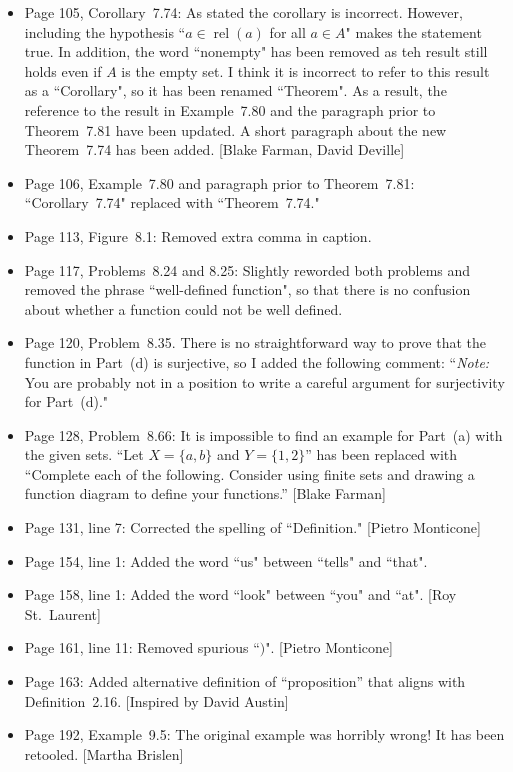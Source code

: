 \documentclass[11pt]{article}%
\DeclareMathOperator{\rel}{rel}
\begin{document}
\begin{itemize}
\item Page 105, Corollary~7.74: As stated the corollary is incorrect. However, including the hypothesis ``$a\in\rel(a)$ for all $a\in A$" makes the statement true. In addition, the word ``nonempty" has been removed as teh result still holds even if $A$ is the empty set. I think it is incorrect to refer to this result as a ``Corollary", so it has been renamed ``Theorem". As a result, the reference to the result in Example~7.80 and the paragraph prior to Theorem~7.81 have been updated. A short paragraph about the new Theorem~7.74 has been added. [Blake Farman, David Deville]
\item Page 106, Example~7.80 and paragraph prior to Theorem~7.81: ``Corollary~7.74" replaced with ``Theorem~7.74."
\item Page 113, Figure~8.1: Removed extra comma in caption.
\item Page 117, Problems~8.24 and 8.25: Slightly reworded both problems and removed the phrase ``well-defined function", so that there is no confusion about whether a function could not be well defined.
\item Page 120, Problem~8.35. There is no straightforward way to prove that the function in Part~(d) is surjective, so I added the following comment: ``\emph{Note:} You are probably not in a position to write a careful argument for surjectivity for Part~(d)."  
\item Page 128, Problem~8.66: It is impossible to find an example for Part~(a) with the given sets.  ``Let $X=\{a,b\}$ and $Y=\{1,2\}$'' has been replaced with ``Complete each of the following. Consider using finite sets and drawing a function diagram to define your functions.'' [Blake Farman]
\item Page 131, line 7: Corrected the spelling of ``Definition." [Pietro Monticone]
\item Page 154, line 1: Added the word ``us" between ``tells" and ``that".
\item Page 158, line 1: Added the word ``look" between ``you" and ``at". [Roy St.~Laurent]
\item Page 161, line 11: Removed spurious ``$)$". [Pietro Monticone]
\item Page 163: Added alternative definition of ``proposition'' that aligns with Definition~2.16. [Inspired by David Austin]
\item Page 192, Example~9.5: The original example was horribly wrong!  It has been retooled. [Martha Brislen]
\end{itemize}
\end{document}
